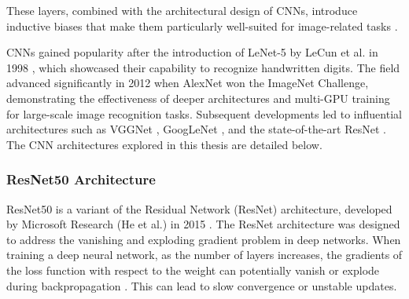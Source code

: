 \noindent These layers, combined with the architectural design of CNNs, introduce inductive biases that make them particularly well-suited for image-related tasks \cite{kim2020inductivebias}. 






CNNs gained popularity after the introduction of LeNet-5 by LeCun et al. in 1998 \cite{lecun1998}, which showcased their capability to recognize handwritten digits. The field advanced significantly in 2012 when AlexNet \cite{NIPS2012_c399862d} won the ImageNet Challenge, demonstrating the effectiveness of deeper architectures and multi-GPU training for large-scale image recognition tasks. Subsequent developments led to influential architectures such as VGGNet \cite{simonyan2015deepconvolutionalnetworkslargescale}, GoogLeNet \cite{szegedy2014goingdeeperconvolutions}, and the state-of-the-art ResNet \cite{he2015deepresiduallearningimage}. The CNN architectures explored in this thesis are detailed below.


\subsubsection{ResNet50 Architecture}
\label{sec:resnet}
ResNet50 is a variant of the Residual Network (ResNet) architecture, developed by Microsoft Research (He et al.) in 2015 \cite{he2015deepresiduallearningimage}. The ResNet architecture was designed to address the vanishing and exploding gradient problem in deep networks. When training a deep neural network, as the number of layers increases, the gradients of the loss function with respect to the weight can potentially vanish or explode during backpropagation \cite{he2015deepresiduallearningimage}. This can lead to slow convergence or unstable updates.

